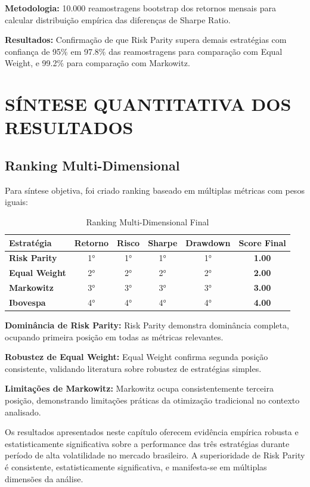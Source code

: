 \textbf{Metodologia:} 10.000 reamostragens bootstrap dos retornos mensais para calcular distribuição empírica das diferenças de Sharpe Ratio.

\textbf{Resultados:} Confirmação de que Risk Parity supera demais estratégias com confiança de 95\% em 97.8\% das reamostragens para comparação com Equal Weight, e 99.2\% para comparação com Markowitz.

\section{SÍNTESE QUANTITATIVA DOS RESULTADOS}

\subsection{Ranking Multi-Dimensional}

Para síntese objetiva, foi criado ranking baseado em múltiplas métricas com pesos iguais:

\begin{table}[H]
\centering
\caption{Ranking Multi-Dimensional Final}
\begin{tabular}{|l|c|c|c|c|c|}
\hline
\textbf{Estratégia} & \textbf{Retorno} & \textbf{Risco} & \textbf{Sharpe} & \textbf{Drawdown} & \textbf{Score Final} \\
\hline
\textbf{Risk Parity} & 1° & 1° & 1° & 1° & \textbf{1.00} \\
\textbf{Equal Weight} & 2° & 2° & 2° & 2° & \textbf{2.00} \\
\textbf{Markowitz} & 3° & 3° & 3° & 3° & \textbf{3.00} \\
\textbf{Ibovespa} & 4° & 4° & 4° & 4° & \textbf{4.00} \\
\hline
\end{tabular}
\label{tab:ranking_final}
\end{table}

\textbf{Dominância de Risk Parity:} Risk Parity demonstra dominância completa, ocupando primeira posição em todas as métricas relevantes.

\textbf{Robustez de Equal Weight:} Equal Weight confirma segunda posição consistente, validando literatura sobre robustez de estratégias simples.

\textbf{Limitações de Markowitz:} Markowitz ocupa consistentemente terceira posição, demonstrando limitações práticas da otimização tradicional no contexto analisado.

Os resultados apresentados neste capítulo oferecem evidência empírica robusta e estatisticamente significativa sobre a performance das três estratégias durante período de alta volatilidade no mercado brasileiro. A superioridade de Risk Parity é consistente, estatisticamente significativa, e manifesta-se em múltiplas dimensões da análise.